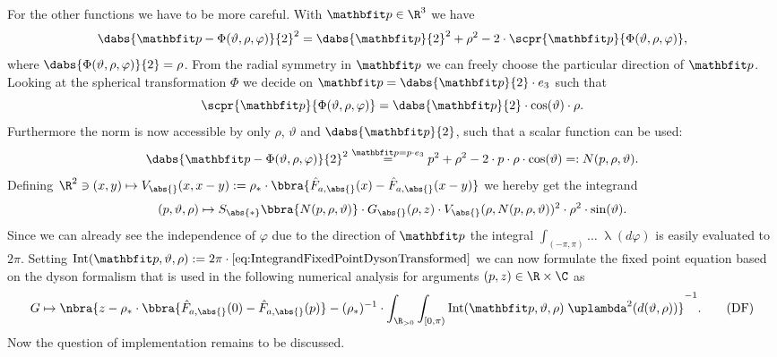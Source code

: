 For the other functions we have to be more careful. With $\vp\in\R^3$ we have
\[
    \dabs{\vp - \Phi(\vartheta,\rho,\varphi)}{2}^2 = \dabs{\vp}{2}^2 + \rho^2 - 2\cdot\scpr{\vp}{\Phi(\vartheta,\rho,\varphi)},
\]
where $\dabs{\Phi(\vartheta,\rho,\varphi)}{2} = \rho$. From the radial symmetry in $\vp$ we can freely choose the particular direction of $\vp$. Looking at the spherical transformation $\Phi$ we decide on $\vp = \dabs{\vp}{2}\cdot e_3$ such that
\[
    \scpr{\vp}{\Phi(\vartheta,\rho,\varphi)} = \dabs{\vp}{2}\cdot\cos(\vartheta)\cdot\rho.
\]
Furthermore the norm is now accessible by only $\rho$, $\vartheta$ and $\dabs{\vp}{2}$, such that a scalar function can be used:
\[
    \dabs{\vp - \Phi(\vartheta,\rho,\varphi)}{2}^2 \stackrel{\vp = p\cdot e_3}{=} p^2 + \rho^2 - 2\cdot p\cdot\rho\cdot\cos(\vartheta) =: N(p,\rho,\vartheta).
\]
Defining $\R^2\ni(x,y)\mapsto V_{\abs{}}(x,x-y):=\rho_*\cdot\bbra{\hat F_{a,\abs{}}(x) - \hat F_{a,\abs{}}(x-y)}$ we hereby get the integrand
\begin{align}
    (p,\vartheta,\rho)\mapsto
    S_{\abs{*}}\bbra{
            N(p,\rho,\vartheta)
        }\cdot G_{\abs{}}(\rho,z)\cdot V_{\abs{}}(\rho,N(p,\rho,\vartheta))^2
    \cdot\rho^2\cdot\sin(\vartheta). \label{eq:IntegrandFixedPointDysonTransformed}
\end{align}
Since we can already see the independence of $\varphi$ due to the direction of $\vp$ the integral $\int_{(-\pi,\pi)}\ldots\;\uplambda(d\varphi)$ is easily evaluated to $2\pi$. Setting $\text{Int}(\vp,\vartheta,\rho):=2\pi\cdot\eqref{eq:IntegrandFixedPointDysonTransformed}$ we can now formulate the fixed point equation based on the dyson formalism that is used in the following numerical analysis for arguments $(p,z)\in\R\times\C$ as
\begin{align}
    G\mapsto \nbra{
        z - \rho_*\cdot\bbra{\hat F_{a,\abs{}}(0) - \hat F_{a,\abs{}}(p)} - (\rho_*)^{-1}\cdot\int_{\R_{>0}}\int_{[0,\pi)}\text{Int}(\vp,\vartheta,\rho)\;\uplambda^2(d(\vartheta,\rho))
    }^{-1}. \label{eq:FixedPointEquationDysonTransformed}\tag{DF}
\end{align}
Now the question of implementation remains to be discussed.